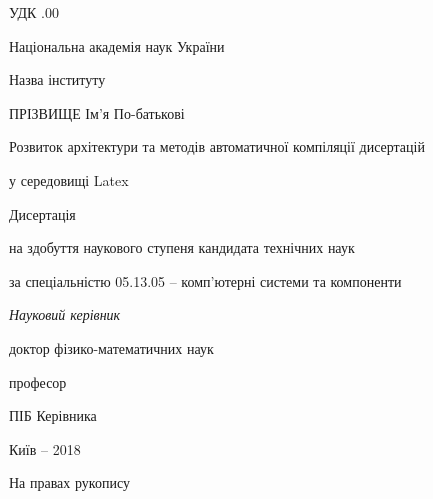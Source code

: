 \documentclass[a4paper,14pt]{extreport}
\begin{document}


\frontmatter 

\thispagestyle{empty}

УДК .00

 \begin{centering}
  \linespread{1.1}
  \vspace{2em}

{Національна академія наук України

Назва інституту}

  \vspace{5em}

ПРІЗВИЩЕ Ім'я По-батькові

  \vspace{2em}

Розвиток архітектури та методів автоматичної компіляції дисертацій

у середовищі Latex

  \vspace{5em}


Дисертація 

на здобуття наукового ступеня кандидата технічних наук

за спеціальністю 05.13.05 -- комп'ютерні системи та компоненти


  \vspace{2em}

\textit{Науковий керівник}

доктор фізико-математичних наук

професор

ПІБ Керівника

\vspace{11em}

  Київ -- 2018

 \end{centering}
\begin{flushright}
 На правах рукопису
\end{flushright} 

\tableofcontents





\mainmatter %



\backmatter
\end{document}
